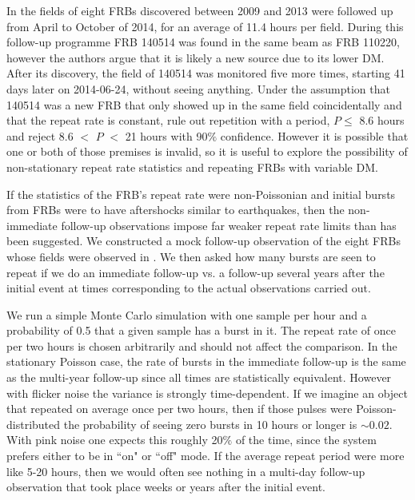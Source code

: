 \documentclass[useAMS,usenatbib]{mn2e}
\begin{document}
In \cite{2015MNRAS.454..457P}
the fields of eight FRBs discovered between 2009 and 2013
were followed up from April to October of 2014, for an average 
of 11.4 hours per field. During this follow-up programme 
FRB 140514 was found in the same beam as FRB 110220, however
the authors argue that it is likely a new source due to its lower DM. 
After its discovery, the field of 140514 was monitored 
five more times, starting 41 days later on 2014-06-24, without seeing anything.
Under the assumption that 140514 was a new FRB 
that only showed up in the same field 
coincidentally and that the repeat rate is constant,
 \cite{2015MNRAS.454..457P} rule out repetition with a period, $P \le$ 8.6 
hours and reject 8.6 $<$ $P$ $<$ 21 hours with 90$\%$ confidence.
However it is possible that one or both of those premises 
is invalid, so it is useful to explore the possibility of non-stationary 
repeat rate statistics and repeating FRBs with variable DM. 

If the statistics of the FRB's repeat rate were
non-Poissonian and initial bursts from FRBs were to have aftershocks
similar to earthquakes, then the non-immediate follow-up observations 
impose far weaker repeat rate limits than has been suggested. We 
constructed a mock follow-up observation of the eight FRBs whose
fields were observed in \cite{2015MNRAS.454..457P}. We then 
asked how many bursts are seen to repeat if we do an immediate
follow-up vs. a follow-up several years after the initial event 
at times corresponding 
to the actual observations carried out. 

We run a simple Monte Carlo 
simulation with one sample per hour and a probability of 0.5 
that a given sample has a burst in it. The repeat rate of once per two hours
is chosen arbitrarily and should not affect the comparison. 
In the stationary Poisson case, the rate of bursts in 
the immediate follow-up is the same as the multi-year follow-up 
since all times are 
statistically equivalent. However with flicker noise 
the variance is strongly time-dependent. If we imagine an object that 
repeated on average once per two hours, then if those pulses were Poisson-distributed 
the probability of seeing zero bursts in 10 hours or longer is $\sim0.02$. With 
pink noise one expects this roughly 20$\%$ of the time, since the system 
prefers either to be in ``on" or ``off" mode. If the average repeat period were more 
like 5-20 hours, then we would often see nothing in a multi-day follow-up 
observation that took place weeks or years after the initial event.
\end{document}
